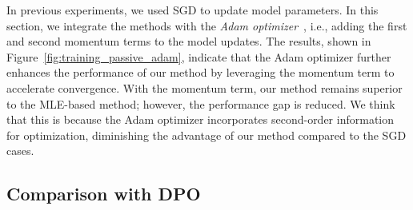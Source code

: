 \begin{figure*}[!t]
    \begin{minipage}[t]{0.99\textwidth}
        \centering
        \hfill
        \hfill
        \hfill
    \end{minipage}
    \caption{For the training stage with \emph{passive data collection}, we compare our proposed method and MLE~\citep{ICML'23:Zhu-Principled} in with passive data collection combined with \emph{Adam}. We report the average accuracy and loss of the reward model during the training process.}
    \label{fig:training_passive_adam}
\end{figure*}

In previous experiments, we used SGD to update model parameters. In this section, we integrate the methods with the \emph{Adam optimizer}~\citep{ICLR'15:Adam}, i.e., adding the first and second momentum terms to the model updates. The results, shown in Figure~\ref{fig:training_passive_adam}, indicate that the Adam optimizer further enhances the performance of our method by leveraging the momentum term to accelerate convergence. With the momentum term, our method remains superior to the MLE-based method; however, the performance gap is reduced. We think that this is because the Adam optimizer incorporates second-order information for optimization, diminishing the advantage of our method compared to the SGD cases.



\subsection{Comparison with DPO}
\label{subsec:detail_exp:dpo}

